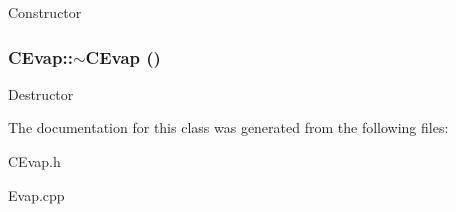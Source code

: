 Constructor 
\subsubsection{\setlength{\rightskip}{0pt plus 5cm}CEvap::$\sim$CEvap ()}\label{classCEvap_759413aca22735496f2bb36c61c5fce4}


Destructor 

The documentation for this class was generated from the following files:\begin{CompactItemize}
\item 
CEvap.h\item 
Evap.cpp\end{CompactItemize}
